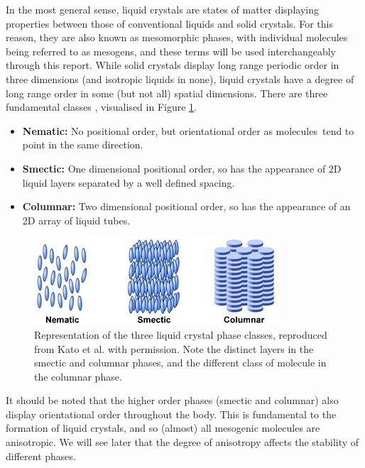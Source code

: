 \documentclass[11pt, a4paper]{article} %
\begin{document}
In the most general sense, liquid crystals are states of matter displaying properties between those of conventional liquids and solid crystals. For this reason, they are also known as mesomorphic phases, with individual molecules being referred to as mesogens, and these terms will be used interchangeably through this report. While solid crystals display long range periodic order in three dimensions (and isotropic liquids in none), liquid crystals have a degree of long range order in some (but not all) spatial dimensions. There are three fundamental classes \cite{DeGennes1993}, visualised in Figure \ref{fig:lcphasescropped}.

\begin{itemize}
	\item \textbf{Nematic:} No positional order, but orientational order as molecules\footnotemark \ tend to point in the same direction.
	\item \textbf{Smectic:} One dimensional positional order, so has the appearance of 2D liquid layers separated by a well defined spacing.
	\item \textbf{Columnar:} Two dimensional positional order, so has the appearance of an 2D array of liquid tubes.
\end{itemize}


\begin{figure} [h!]
	\centering
	\includegraphics[width=0.7\linewidth]{Figures/lc_phases_cropped}
	\caption{Representation of the three liquid crystal phase classes, reproduced from Kato et al. \cite{Kato2007} with permission. Note the distinct layers in the smectic and columnar phases, and the different class of molecule in the columnar phase.}
	\label{fig:lcphasescropped}
\end{figure}


It should be noted that the higher order phases (smectic and columnar) also display orientational order throughout the body. This is fundamental to the formation of liquid crystals, and so (almost) all mesogenic molecules are anisotropic. We will see later that the degree of anisotropy affects the stability of different phases. 
\end{document}

